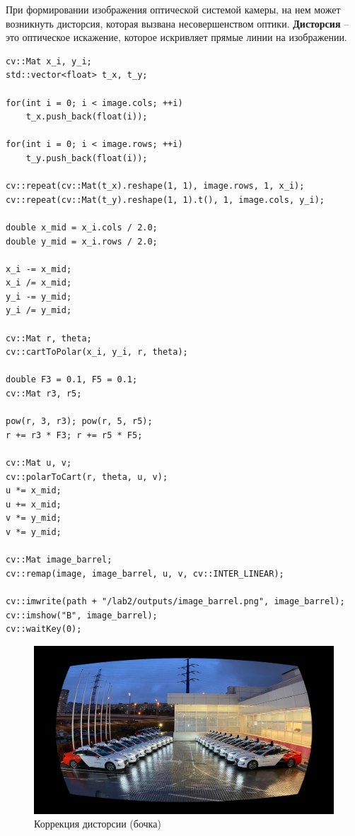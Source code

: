 При формировании изображения оптической системой камеры, на нем может возникнуть дисторсия, которая вызвана несовершенством оптики.
\textbf{Дисторсия} -- это оптическое искажение, которое искривляет прямые линии на изображении.

\begin{lstlisting}[style=cpp_white, caption={Исходный код для коррекции бочкообразной дисторсии}]
cv::Mat x_i, y_i;
std::vector<float> t_x, t_y;

for(int i = 0; i < image.cols; ++i)
    t_x.push_back(float(i));

for(int i = 0; i < image.rows; ++i)
    t_y.push_back(float(i));

cv::repeat(cv::Mat(t_x).reshape(1, 1), image.rows, 1, x_i);
cv::repeat(cv::Mat(t_y).reshape(1, 1).t(), 1, image.cols, y_i);

double x_mid = x_i.cols / 2.0;
double y_mid = x_i.rows / 2.0;

x_i -= x_mid;
x_i /= x_mid;
y_i -= y_mid;
y_i /= y_mid;

cv::Mat r, theta;
cv::cartToPolar(x_i, y_i, r, theta);

double F3 = 0.1, F5 = 0.1;
cv::Mat r3, r5;

pow(r, 3, r3); pow(r, 5, r5);
r += r3 * F3; r += r5 * F5;

cv::Mat u, v;
cv::polarToCart(r, theta, u, v);
u *= x_mid;
u += x_mid;
v *= y_mid;
v *= y_mid;

cv::Mat image_barrel;
cv::remap(image, image_barrel, u, v, cv::INTER_LINEAR);

cv::imwrite(path + "/lab2/outputs/image_barrel.png", image_barrel);
cv::imshow("B", image_barrel);
cv::waitKey(0);
\end{lstlisting}

\begin{figure}[ht]
    \includegraphics[width=\textwidth]{../outputs/image_barrel.png}
    \caption{Коррекция дисторсии (бочка)}
    \label{fig:distortion_correction_barrel}
\end{figure}

